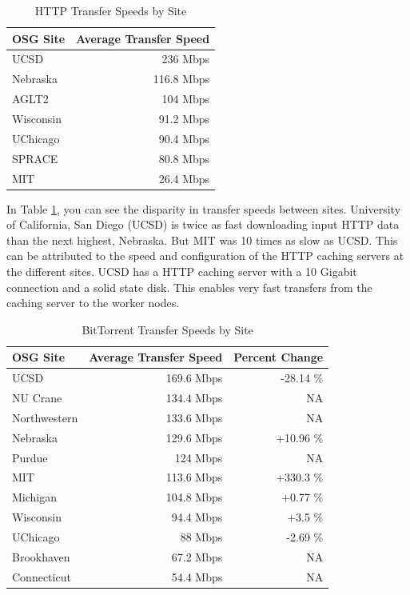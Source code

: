 \begin{table}[h!t]
	\centering
	\bgroup
	\def\arraystretch{1.5}
	\begin{tabular}{l|r}
\textbf{OSG Site} & \textbf{Average Transfer Speed} \\ \hline
UCSD & 236 Mbps \\ \hline
Nebraska & 116.8 Mbps \\ \hline
AGLT2 & 104 Mbps \\ \hline
Wisconsin & 91.2 Mbps \\ \hline
UChicago & 90.4 Mbps \\ \hline
SPRACE & 80.8 Mbps \\ \hline
MIT & 26.4 Mbps \\ \hline
	\end{tabular}
	\egroup
	\caption{HTTP Transfer Speeds by Site}
	\label{tbl:transferspeedsites}
\end{table}

In Table \ref{tbl:transferspeedsites}, you can see the disparity in transfer speeds between sites.  University of California, San Diego (UCSD) is twice as fast downloading input HTTP data than the next highest, Nebraska.  But MIT was 10 times as slow as UCSD.  This can be attributed to the speed and configuration of the HTTP caching servers at the different sites.  UCSD has a HTTP caching server with a 10 Gigabit connection and a solid state disk.  This enables very fast transfers from the caching server to the worker nodes.


\begin{table}[h!t]
\centering
\bgroup
\def\arraystretch{1.5}
\begin{tabular}{l|r|r}
	\textbf{OSG Site} & \textbf{Average Transfer Speed} & \textbf{Percent Change} \\ \hline
	UCSD & 169.6 Mbps & -28.14 \% \\ \hline
	NU Crane & 134.4 Mbps & NA \\ \hline
	Northwestern & 133.6 Mbps & NA \\ \hline
	Nebraska & 129.6 Mbps & +10.96 \% \\ \hline
	Purdue & 124 Mbps & NA \\ \hline
	MIT & 113.6 Mbps & +330.3 \% \\ \hline
	Michigan & 104.8 Mbps & +0.77 \% \\ \hline
	Wisconsin & 94.4 Mbps & +3.5 \% \\ \hline
	UChicago & 88 Mbps & -2.69 \% \\ \hline
	Brookhaven & 67.2 Mbps & NA \\ \hline
	Connecticut & 54.4 Mbps & NA \\ \hline
	
\end{tabular}
\egroup
\caption{BitTorrent Transfer Speeds by Site}
\label{tbl:bittorrenttransferspeedsites}
\end{table}

